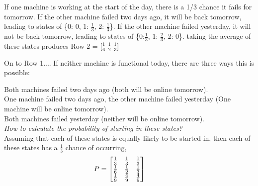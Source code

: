 \documentclass{article}
\begin{document}
\begin{enumerate}
If one machine is working at the start of the day, there is a 1/3 chance it fails for tomorrow. If the other machine failed two days ago, it will be back tomorrow, leading to states of \{0: 0, 1: $\frac{1}{3}$, 2: $\frac{1}{3}$\}. If the other machine failed yesterday, it will not be back tomorrow, leading to states of \{0:$\frac{1}{3}$, 1: $\frac{2}{3}$, 2: 0\}. taking the average of these states produces Row 2 = [$\frac{1}{6}$ $\frac{1}{2}$ $\frac{1}{3}$]

On to Row 1.... If neither machine is functional today, there are three ways this is possible:

Both machines failed two days ago (both will be online tomorrow).\\
One machine failed two days ago, the other machine failed yesterday (One machine will be online tomorrow).\\
Both machines failed yesterday (neither will be online tomorrow).\\
\emph{How to calculate the probability of starting in these states?}\\
Assuming that each of these states is equally likely to be started in, then each of these states has a $\frac{1}{3}$ chance of occurring,
\[
P = 
\begin{bmatrix}
\frac{1}{3} & \frac{1}{3} & \frac{1}{3}\\
\frac{1}{6} & \frac{1}{2} & \frac{1}{3}\\
\frac{1}{9} & \frac{4}{9} & \frac{4}{9}
\end{bmatrix}\hspace*{1cm}
\]

\end{enumerate}
\end{document}
